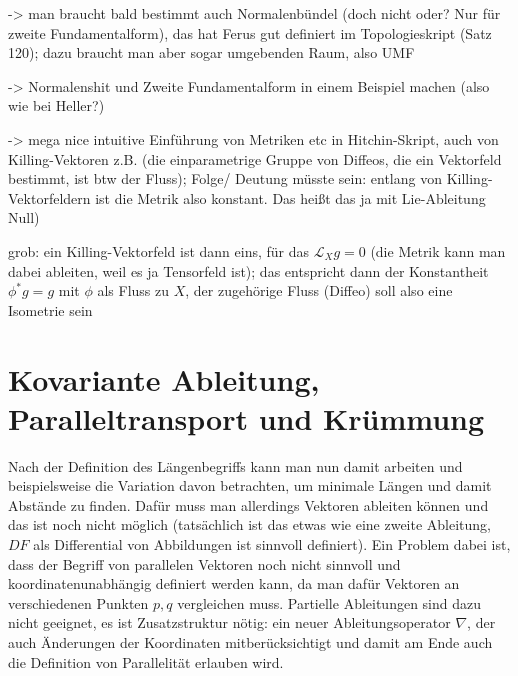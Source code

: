 -> man braucht bald bestimmt auch Normalenbündel (doch nicht oder? Nur für zweite Fundamentalform), das hat Ferus gut definiert im Topologieskript (Satz 120); dazu braucht man aber sogar umgebenden Raum, also UMF

-> Normalenshit und Zweite Fundamentalform in einem Beispiel machen (also wie bei Heller?)


-> mega nice intuitive Einführung von Metriken etc in Hitchin-Skript, auch von Killing-Vektoren z.B. (die einparametrige Gruppe von Diffeos, die ein Vektorfeld bestimmt, ist btw der Fluss); Folge/ Deutung müsste sein: entlang von Killing-Vektorfeldern ist die Metrik also konstant. Das heißt das ja mit Lie-Ableitung Null)


grob: ein Killing-Vektorfeld ist dann eins, für das $\mathcal{L}_X g = 0$ (die Metrik kann man dabei ableiten, weil es ja Tensorfeld ist); das entspricht dann der Konstantheit $\phi^* g = g$ mit $\phi$ als Fluss zu $X$, der zugehörige Fluss (Diffeo) soll also eine Isometrie sein


\newpage


	\section{Kovariante Ableitung, Paralleltransport und Krümmung}
Nach der Definition des Längenbegriffs kann man nun damit arbeiten und beispielsweise die Variation davon betrachten, um minimale Längen und damit Abstände zu finden. Dafür muss man allerdings Vektoren ableiten können und das ist noch nicht möglich (tatsächlich ist das etwas wie eine zweite Ableitung, $DF$ als Differential von Abbildungen ist sinnvoll definiert). Ein Problem dabei ist, dass der Begriff von parallelen Vektoren noch nicht sinnvoll und koordinatenunabhängig definiert werden kann, da man dafür Vektoren an verschiedenen Punkten $p, q$ vergleichen muss. %
Partielle Ableitungen sind dazu nicht geeignet, es ist Zusatzstruktur nötig: ein neuer Ableitungsoperator $\nabla$, der auch Änderungen der Koordinaten mitberücksichtigt und damit am Ende auch die Definition von Parallelität erlauben wird.


